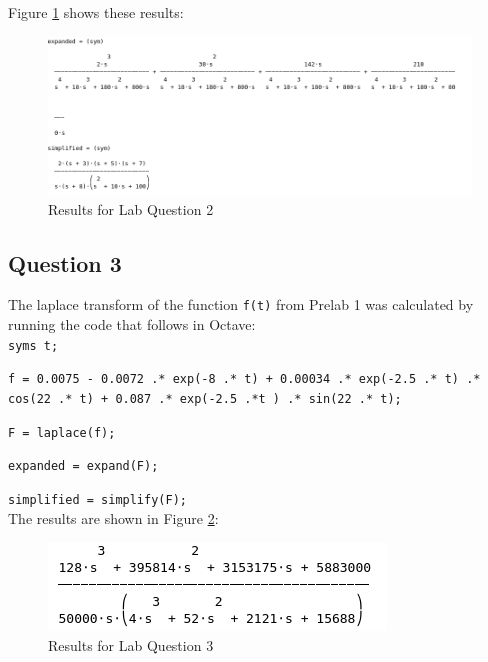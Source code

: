 \documentclass[12pt, a4paper]{article}
\begin{document}
    Figure \ref{fig:question_2} shows these results:\\

    \begin{figure}[H]
		\centering
		\includegraphics[width=\textwidth]{question_2}
		\caption{Results for Lab Question 2}
		\label{fig:question_2}
	\end{figure}

	\subsection{Question 3}
	The laplace transform of the function \texttt{f(t)} from Prelab 1 was calculated by running the code that follows in Octave:\\
	
	\texttt{syms t;}\par
  	\texttt{f = 0.0075 - 0.0072 .* exp(-8 .* t) + 0.00034 .* exp(-2.5 .* t) .* cos(22 .* t) + 0.087 .* exp(-2.5 .*t ) .* sin(22 .* t);}\par
  	\texttt{F = laplace(f);}\par
  	\texttt{expanded = expand(F);}\par
  	\texttt{simplified = simplify(F);}\\

  	The results are shown in Figure \ref{fig:question_3}:\\

  	\begin{figure}[H]
		\centering
		\includegraphics[width=\textwidth]{question_3}
		\caption{Results for Lab Question 3}
		\label{fig:question_3}
	\end{figure}
\end{document}
